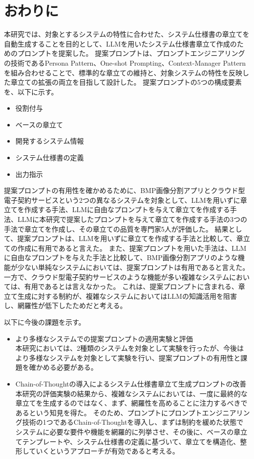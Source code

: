 \chapter{おわりに}\label{cha:Conclusion}

本研究では、対象とするシステムの特性に合わせた、システム仕様書の章立てを自動生成することを目的として、LLMを用いたシステム仕様書章立て作成のためのプロンプトを提案した。
提案プロンプトは、プロンプトエンジニアリングの技術であるPersona Pattern、One-shot Prompting、Context-Manager Patternを組み合わせることで、標準的な章立ての維持と、対象システムの特性を反映した章立ての拡張の両立を目指して設計した。
提案プロンプトの5つの構成要素を、以下に示す。
\begin{itemize}
    \item 役割付与
    \item ベースの章立て
    \item 開発するシステム情報
    \item システム仕様書の定義
    \item 出力指示
\end{itemize}

提案プロンプトの有用性を確かめるために、BMP画像分割アプリとクラウド型電子契約サービスという2つの異なるシステムを対象として、LLMを用いずに章立てを作成する手法、LLMに自由なプロンプトを与えて章立てを作成する手法、LLMに本研究で提案したプロンプトを与えて章立てを作成する手法の3つの手法で章立てを作成し、その章立ての品質を専門家5人が評価した。
結果として、提案プロンプトは、LLMを用いずに章立てを作成する手法と比較して、章立ての作成に有用であると言えた。
また、提案プロンプトを用いた手法は、LLMに自由なプロンプトを与えた手法と比較して、BMP画像分割アプリのような機能が少ない単純なシステムにおいては、提案プロンプトは有用であると言えた。
一方で、クラウド型電子契約サービスのような機能が多い複雑なシステムにおいては、有用であるとは言えなかった。
これは、提案プロンプトに含まれる、章立て生成に対する制約が、複雑なシステムにおいてはLLMの知識活用を阻害し、網羅性が低下したためだと考える。

以下に今後の課題を示す。

\begin{itemize}
    \item より多様なシステムでの提案プロンプトの適用実験と評価\\
    本研究においては、2種類のシステムを対象として実験を行ったが、今後はより多様なシステムを対象として実験を行い、提案プロンプトの有用性と課題を確かめる必要がある。
    \item Chain-of-Thoughtの導入によるシステム仕様書章立て生成プロンプトの改善\\
    本研究の評価実験の結果から、複雑なシステムにおいては、一度に最終的な章立てを生成するのではなく、まず、網羅性を高めることに注力するべきであるという知見を得た。
    そのため、プロンプトにプロンプトエンジニアリング技術の1つであるChain-of-Thoughtを導入し、まずは制約を緩めた状態でシステムに必要な要件や機能を網羅的に列挙させ、その後に、ベースの章立てテンプレートや、システム仕様書の定義に基づいて、章立てを構造化、整形していくというアプローチが有効であると考える。
\end{itemize}

